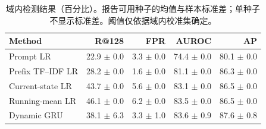 \begin{table}[t]
\centering\footnotesize
\caption{域内检测结果（百分比）。报告可用种子的均值与样本标准差；单种子不显示标准差。阈值仅依据域内校准集确定。}\label{tab:main}
\begin{tabular}{lrrrr}\toprule
Method & R@128 & FPR & AUROC & AP \\
\midrule
Prompt LR & 22.9 $\pm$ 0.0 & 3.3 $\pm$ 0.0 & 74.4 $\pm$ 0.0 & 80.1 $\pm$ 0.0 \\
Prefix TF--IDF LR & 28.2 $\pm$ 0.0 & 1.6 $\pm$ 0.0 & 81.1 $\pm$ 0.0 & 86.3 $\pm$ 0.0 \\
Current-state LR & 43.7 $\pm$ 0.0 & 5.6 $\pm$ 0.0 & 83.1 $\pm$ 0.0 & 86.5 $\pm$ 0.0 \\
Running-mean LR & 46.1 $\pm$ 0.0 & 6.2 $\pm$ 0.0 & 83.5 $\pm$ 0.0 & 86.5 $\pm$ 0.0 \\
Dynamic GRU & 38.1 $\pm$ 6.3 & 3.3 $\pm$ 1.0 & 83.6 $\pm$ 0.9 & 87.6 $\pm$ 0.8 \\
\bottomrule\end{tabular}
\end{table}
